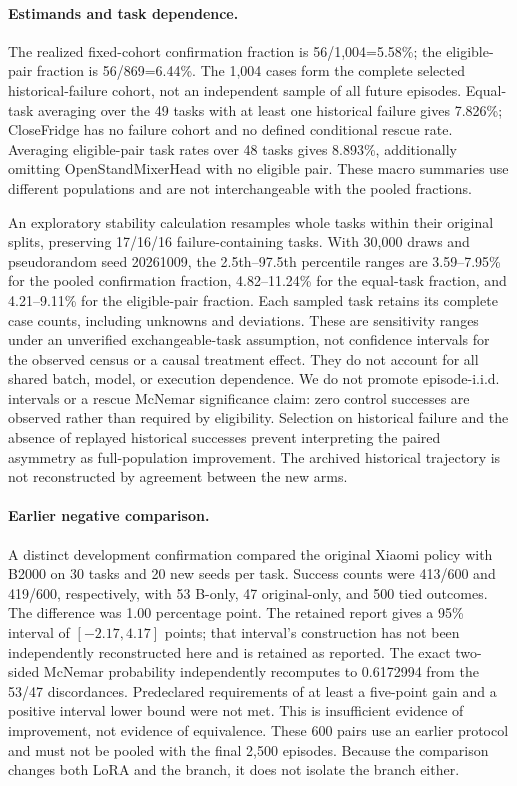 \paragraph{Estimands and task dependence.}
The realized fixed-cohort confirmation fraction is 56/1,004=5.58\%; the eligible-pair fraction is 56/869=6.44\%. The 1,004 cases form the complete selected historical-failure cohort, not an independent sample of all future episodes. Equal-task averaging over the 49 tasks with at least one historical failure gives 7.826\%; CloseFridge has no failure cohort and no defined conditional rescue rate. Averaging eligible-pair task rates over 48 tasks gives 8.893\%, additionally omitting OpenStandMixerHead with no eligible pair. These macro summaries use different populations and are not interchangeable with the pooled fractions.

An exploratory stability calculation resamples whole tasks within their original splits, preserving 17/16/16 failure-containing tasks. With 30,000 draws and pseudorandom seed 20261009, the 2.5th--97.5th percentile ranges are 3.59--7.95\% for the pooled confirmation fraction, 4.82--11.24\% for the equal-task fraction, and 4.21--9.11\% for the eligible-pair fraction. Each sampled task retains its complete case counts, including unknowns and deviations. These are sensitivity ranges under an unverified exchangeable-task assumption, not confidence intervals for the observed census or a causal treatment effect. They do not account for all shared batch, model, or execution dependence. We do not promote episode-i.i.d. intervals or a rescue McNemar significance claim: zero control successes are observed rather than required by eligibility. Selection on historical failure and the absence of replayed historical successes prevent interpreting the paired asymmetry as full-population improvement. The archived historical trajectory is not reconstructed by agreement between the new arms.

\paragraph{Earlier negative comparison.}
A distinct development confirmation compared the original Xiaomi policy with B2000 on 30 tasks and 20 new seeds per task. Success counts were 413/600 and 419/600, respectively, with 53 B-only, 47 original-only, and 500 tied outcomes. The difference was 1.00 percentage point. The retained report gives a 95\% interval of $[-2.17,4.17]$ points; that interval's construction has not been independently reconstructed here and is retained as reported. The exact two-sided McNemar probability independently recomputes to 0.6172994 from the 53/47 discordances. Predeclared requirements of at least a five-point gain and a positive interval lower bound were not met. This is insufficient evidence of improvement, not evidence of equivalence. These 600 pairs use an earlier protocol and must not be pooled with the final 2,500 episodes. Because the comparison changes both LoRA and the branch, it does not isolate the branch either.

